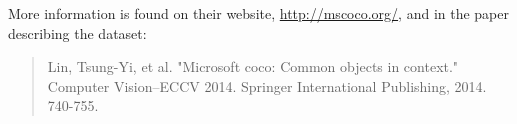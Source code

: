 \documentclass[xetex,mathserif,serif,aspectratio=169]{beamer}
\begin{document}
\begin{frame}[fragile] \frametitle{} \oldB \small

More information is found on their website, \url{http://mscoco.org/},
and in the paper describing the dataset:
\begin{quote}
Lin, Tsung-Yi, et al. "Microsoft coco: Common objects in context."
Computer Vision–ECCV 2014. Springer International Publishing, 2014. 740-755.
\end{quote}

\end{frame}
\end{document}
